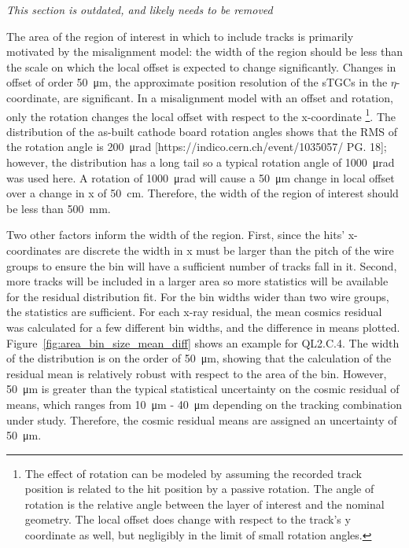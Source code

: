 \textit{This section is outdated, and likely needs to be removed}

The area of the region of interest in which to include tracks is primarily motivated by the misalignment model: the width of the region should be less than the scale on which the local offset is expected to change significantly. Changes in offset of order \SI{50}{\micro\meter}, the approximate position resolution of the sTGCs in the $\eta$-coordinate, are significant. In a misalignment model with an offset and rotation, only the rotation changes the local offset with respect to the x-coordinate \footnote{The effect of rotation can be modeled by assuming the recorded track position is related to the hit position by a passive rotation. The angle of rotation is the relative angle between the layer of interest and the nominal geometry. The local offset does change with respect to the track's y coordinate as well, but negligibly in the limit of small rotation angles.}.  The distribution of the as-built cathode board rotation angles shows that the RMS of the rotation angle is \SI{200}{\micro\radian} [https://indico.cern.ch/event/1035057/ PG. 18]; however, the distribution has a long tail so a typical rotation angle of \SI{1000}{\micro\radian} was used here. A rotation of \SI{1000}{\micro\radian} will cause a \SI{50}{\micro\meter} change in local offset over a change in x of \SI{50}{\centi\meter}. Therefore, the width of the region of interest should be less than \SI{500}{\milli\meter}.

Two other factors inform the width of the region. First, since the hits' x-coordinates are discrete the width in x must be larger than the pitch of the wire groups to ensure the bin will have a sufficient number of tracks fall in it. Second, more tracks will be included in a larger area so more statistics will be available for the residual distribution fit. For the bin widths wider than two wire groups, the statistics are sufficient. For each x-ray residual, the mean cosmics residual was calculated for a few different bin widths, and the difference in means plotted. Figure~\ref{fig:area_bin_size_mean_diff} shows an example for QL2.C.4. The width of the distribution is on the order of \SI{50}{\micro\meter}, showing that the calculation of the residual mean is relatively robust with respect to the area of the bin. However, \SI{50}{\micro\meter} is greater than the typical statistical uncertainty on the cosmic residual of means, which ranges from \SI{10}{\micro\meter} - \SI{40}{\micro\meter} depending on the tracking combination under study. Therefore, the cosmic residual means are assigned an uncertainty of \SI{50}{\micro\meter}.

